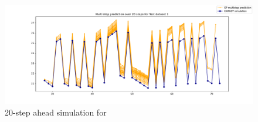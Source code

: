 \begin{figure}[ht]
    \centering
    \includegraphics[width =
    \textwidth]{Plots/SVGP_123_test_prediction_20_steps.pdf}
    \caption{20-step ahead simulation for }
    \label{fig:SVGP_multistep_validation}
\end{figure}


\clearpage
